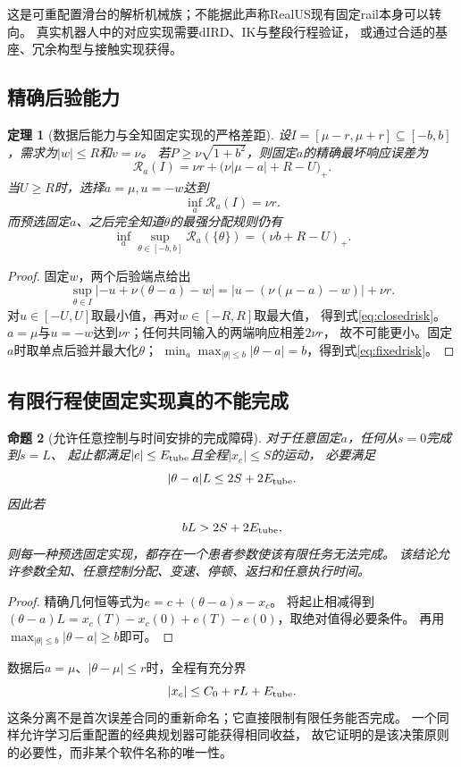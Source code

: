 \documentclass[11pt,a4paper]{article}
\numberwithin{equation}{section}
\newtheorem{theorem}{定理}[section]
\newtheorem{proposition}[theorem]{命题}
\theoremstyle{definition}
\begin{document}
这是可重配置滑台的解析机械族；不能据此声称RealUS现有固定rail本身可以转向。
真实机器人中的对应实现需要dIRD、IK与整段行程验证，
或通过合适的基座、冗余构型与接触实现获得。

\subsection{精确后验能力}
\begin{theorem}[数据后能力与全知固定实现的严格差距]
设$I=[\mu-r,\mu+r]\subseteq[-b,b]$，需求为$|w|\le R$和$v=\nu$。
若$P\ge\nu\sqrt{1+b^2}$，则固定$a$的精确最坏响应误差为
\begin{equation}
 \mathcal R_a(I)
 =\nu r+\bigl(\nu|\mu-a|+R-U\bigr)_+.
 \label{eq:closedrisk}
\end{equation}
当$U\ge R$时，选择$a=\mu,u=-w$达到
\[
 \inf_a\mathcal R_a(I)=\nu r.
\]
而预选固定$a$、之后完全知道$\theta$的最强分配规则仍有
\begin{equation}
 \inf_a\sup_{\theta\in[-b,b]}
 \mathcal R_a(\{\theta\})=(\nu b+R-U)_+.
 \label{eq:fixedrisk}
\end{equation}
\end{theorem}
\begin{proof}
固定$w$，两个后验端点给出
\[
 \sup_{\theta\in I}|-u+\nu(\theta-a)-w|
 =|u-(\nu(\mu-a)-w)|+\nu r.
\]
对$u\in[-U,U]$取最小值，再对$w\in[-R,R]$取最大值，
得到式\eqref{eq:closedrisk}。
$a=\mu$与$u=-w$达到$\nu r$；任何共同输入的两端响应相差$2\nu r$，
故不可能更小。固定$a$时取单点后验并最大化$\theta$；
$\min_a\max_{|\theta|\le b}|\theta-a|=b$，得到式\eqref{eq:fixedrisk}。
\end{proof}

\subsection{有限行程使固定实现真的不能完成}
\begin{proposition}[允许任意控制与时间安排的完成障碍]
对于任意固定$a$，任何从$s=0$完成到$s=L$、
起止都满足$|e|\le E_{\rm tube}$且全程$|x_c|\le S$的运动，
必要满足
\begin{equation}
 |\theta-a|L\le2S+2E_{\rm tube}.
 \label{eq:strokenec}
\end{equation}
因此若
\begin{equation}
 bL>2S+2E_{\rm tube},
 \label{eq:fixedfail}
\end{equation}
则每一种预选固定实现，都存在一个患者参数使该有限任务无法完成。
该结论允许参数全知、任意控制分配、变速、停顿、返扫和任意执行时间。
\end{proposition}
\begin{proof}
精确几何恒等式为$e=c+(\theta-a)s-x_c$。
将起止相减得到
$(\theta-a)L=x_c(T)-x_c(0)+e(T)-e(0)$，取绝对值得必要条件。
再用$\max_{|\theta|\le b}|\theta-a|\ge b$即可。
\end{proof}
数据后$a=\mu$、$|\theta-\mu|\le r$时，全程有充分界
\begin{equation}
 |x_c|\le C_0+rL+E_{\rm tube}.
 \label{eq:strokesuff}
\end{equation}
这条分离不是首次误差合同的重新命名；它直接限制有限任务能否完成。
一个同样允许学习后重配置的经典规划器可能获得相同收益，
故它证明的是该决策原则的必要性，而非某个软件名称的唯一性。
\end{document}
